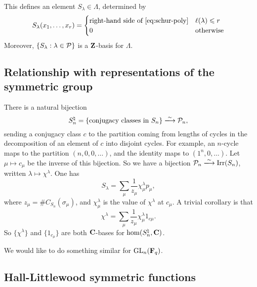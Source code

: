 \documentclass{article}
\begin{document}
This defines an element $S_\lambda\in \Lambda$, determined by 
\[
  S_\lambda(x_1,\dots,x_r) = \begin{cases} \text{right-hand side of \eqref{eq:schur-poly}} & \ell(\lambda) \leqslant r \\ 0 & \text{otherwise} \end{cases}
\]
Moreover, $\{S_\lambda:\lambda\in \mathcal{P}\}$ is a $\mathbf{Z}$-basis for $\Lambda$. 


\subsection{Relationship with representations of the symmetric group}

There is a natural bijection 
\[
  S_n^\natural = \{\text{conjugacy classes in }S_n\} \isomorphism \cP_n ,
\]
sending a conjugacy class $c$ to the partition coming from lengths of cycles in 
the decomposition of an element of $c$ into disjoint cycles. For example, an 
$n$-cycle maps to the partition $(n,0,0,\dots)$, and the identity maps to 
$(1^n,0,\dots)$. Let $\mu\mapsto c_\mu$ be the inverse of this bijection. 
So we have a bijection $\cP_n \isomorphism \irreducible(S_n)$, 
written $\lambda\mapsto \chi^\lambda$. One has 
\[
  S_\lambda = \sum_\mu \frac{1}{z_\mu} \chi_\mu^\lambda p_\mu , 
\]
where $z_\mu = \# C_{S_n}(\sigma_\mu)$, and 
$\chi_\mu^\lambda$ is the value of $\chi^\lambda$ at $c_\mu$. A trivial 
corollary is that 
\[
  \chi^\lambda = \sum_\mu \frac{1}{z_\mu} \chi_\mu^\lambda 1_{c\mu} .
\]
So $\{\chi^\lambda\}$ and $\{1_{c_\mu}\}$ are both $\mathbf{C}$-bases for 
$\hom(S_n^\natural,\mathbf{C})$. 

We would like to do something similar for $\operatorname{GL}_n(\mathbf{F}_q)$. 


\subsection{Hall-Littlewood symmetric functions}
\end{document}
